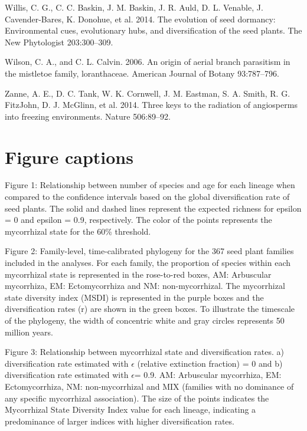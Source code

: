 \documentclass[
  12pt,
]{article}
\newenvironment{cslreferences}%
  {}%
  {\par}
\begin{document}
\begin{cslreferences}
\leavevmode\hypertarget{ref-willis_2014}{}%
Willis, C. G., C. C. Baskin, J. M. Baskin, J. R. Auld, D. L. Venable, J.
Cavender-Bares, K. Donohue, et al. 2014. The evolution of seed dormancy:
Environmental cues, evolutionary hubs, and diversification of the seed
plants. The New Phytologist 203:300--309.

\leavevmode\hypertarget{ref-wilson_2006}{}%
Wilson, C. A., and C. L. Calvin. 2006. An origin of aerial branch
parasitism in the mistletoe family, loranthaceae. American Journal of
Botany 93:787--796.

\leavevmode\hypertarget{ref-zanne_2014}{}%
Zanne, A. E., D. C. Tank, W. K. Cornwell, J. M. Eastman, S. A. Smith, R.
G. FitzJohn, D. J. McGlinn, et al. 2014. Three keys to the radiation of
angiosperms into freezing environments. Nature 506:89--92.
\end{cslreferences}

\newpage

\hypertarget{figure-captions}{%
\section{Figure captions}\label{figure-captions}}

Figure 1: Relationship between number of species and age for each
lineage when compared to the confidence intervals based on the global
diversification rate of seed plants. The solid and dashed lines
represent the expected richness for epsilon = 0 and epsilon = 0.9,
respectively. The color of the points represents the mycorrhizal state
for the 60\% threshold.

Figure 2: Family-level, time-calibrated phylogeny for the 367 seed plant
families included in the analyses. For each family, the proportion of
species within each mycorrhizal state is represented in the rose-to-red
boxes, AM: Arbuscular mycorrhiza, EM: Ectomycorrhiza and NM:
non-mycorrhizal. The mycorrhizal state diversity index (MSDI) is
represented in the purple boxes and the diversification rates (r) are
shown in the green boxes. To illustrate the timescale of the phylogeny,
the width of concentric white and gray circles represents 50 million
years.

Figure 3: Relationship between mycorrhizal state and diversification
rates. a) diversification rate estimated with \(\epsilon\) (relative
extinction fraction) = 0 and b) diversification rate estimated with
\(\epsilon\)= 0.9. AM: Arbuscular mycorrhiza, EM: Ectomycorrhiza, NM:
non-mycorrhizal and MIX (families with no dominance of any specific
mycorrhizal association). The size of the points indicates the
Mycorrhizal State Diversity Index value for each lineage, indicating a
predominance of larger indices with higher diversification rates.
\end{document}
